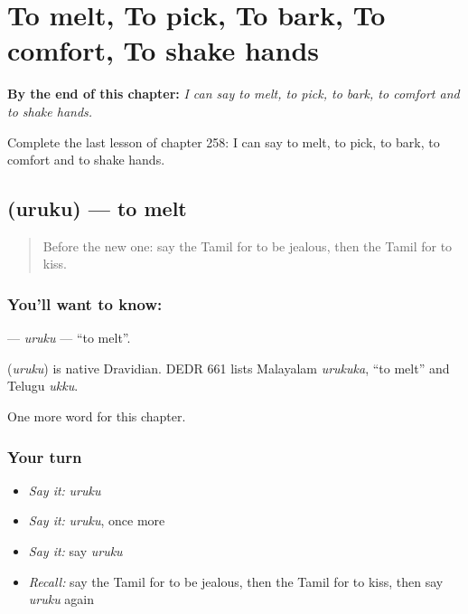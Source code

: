 
\chapter{To melt, To pick, To bark, To comfort, To shake hands}
\label{ch:ta-to-melt-to-pick-to-bark-to-comfort-to-shake-hands}

\begin{chapteropening}
\textbf{By the end of this chapter:} \emph{I can say to melt, to pick, to bark, to comfort and to shake hands.}

Complete the last lesson of chapter 258: I can say to melt, to pick, to bark, to comfort and to shake hands.
\end{chapteropening}

\section[\texorpdfstring{\ta{உருகு} (uruku)}{உருகு (uruku)}]{ (uruku) — to melt}

\label{lesson:TA-C258-uruku}



\begin{quote}
Before the new one: say the Tamil for to be jealous, then the Tamil for to kiss.
\end{quote}

\subsection*{You'll want to know: }
\textbf{} — \emph{uruku} — \textquotedblleft{}to melt\textquotedblright{}.

\begin{cousinweb}
\textbf{} (\emph{uruku}) is native Dravidian. DEDR 661 lists Malayalam \emph{urukuka}, \textquotedblleft{}to melt\textquotedblright{} and Telugu \emph{ukku}.
\end{cousinweb}

\begin{grammarlens}[title={What you've built}]
One more word for this chapter.
\end{grammarlens}

\subsection*{Your turn}
\begin{itemize}
\raggedright
  \item \emph{Say it:} \emph{uruku}
  \item \emph{Say it:} \emph{uruku}, once more
  \item \emph{Say it:} say \emph{uruku}
  \item \emph{Recall:} say the Tamil for to be jealous, then the Tamil for to kiss, then say \emph{uruku} again
\end{itemize}


